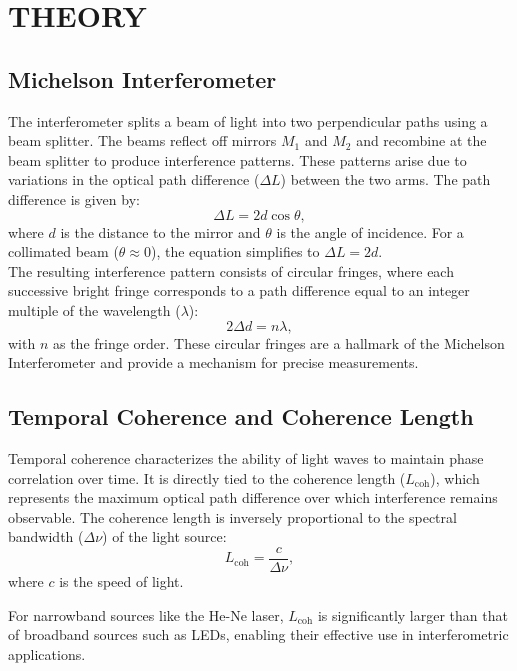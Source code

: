 \documentclass[a4paper,11pt]{article}
\begin{document}
\newpage
\section{\centering THEORY}
\label{sec:THEORY}
\indent

\subsection{Michelson Interferometer}
\indent

The interferometer splits a beam of light into two perpendicular paths using a beam splitter. The beams reflect off mirrors \(M_1\) and \(M_2\) and recombine at the beam splitter to produce interference patterns. These patterns arise due to variations in the optical path difference (\(\Delta L\)) between the two arms. The path difference is given by:
\[
\Delta L = 2d \cos \theta,
\]
where \(d\) is the distance to the mirror and \(\theta\) is the angle of incidence. For a collimated beam (\(\theta \approx 0\)), the equation simplifies to \(\Delta L = 2d\).\\

The resulting interference pattern consists of circular fringes, where each successive bright fringe corresponds to a path difference equal to an integer multiple of the wavelength (\(\lambda\)):
\[
2\Delta d = n\lambda,
\]
with \(n\) as the fringe order. These circular fringes are a hallmark of the Michelson Interferometer and provide a mechanism for precise measurements.\\

\subsection{Temporal Coherence and Coherence Length \autocite{phywe_2019}\autocite{UCSB_HeNe_Lasers}}
\indent

Temporal coherence characterizes the ability of light waves to maintain phase correlation over time. It is directly tied to the coherence length (\(L_{\text{coh}}\)), which represents the maximum optical path difference over which interference remains observable. The coherence length is inversely proportional to the spectral bandwidth (\(\Delta \nu\)) of the light source:
\[
L_{\text{coh}} = \frac{c}{\Delta \nu},
\]
where \(c\) is the speed of light.

For narrowband sources like the He-Ne laser, \(L_{\text{coh}}\) is significantly larger than that of broadband sources such as LEDs, enabling their effective use in interferometric applications.\\
\end{document}
